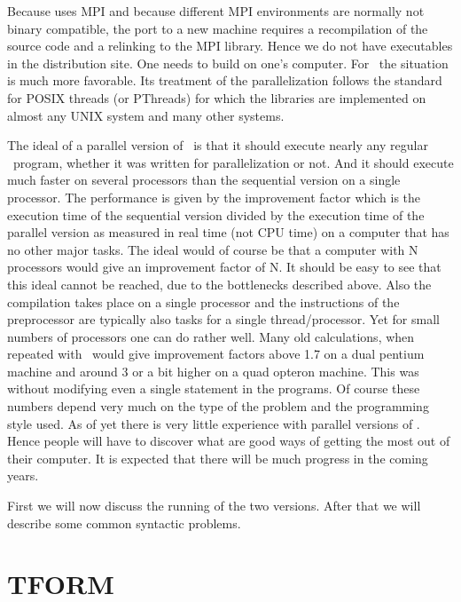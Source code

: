 Because \ParFORM{} uses MPI and because different MPI 
environments are normally not binary compatible, the port to a new machine 
requires a recompilation of the source code and a relinking to the MPI 
library. Hence we do not have executables in the distribution site.
One needs to build \ParFORM{} on one's computer.
For \TFORM\ the situation is much more favorable. Its treatment of the 
parallelization follows the standard for POSIX threads (or 
PThreads) for which the libraries are implemented on almost any 
UNIX system and many other systems.

The ideal of a parallel version of \FORM\ is that it should execute nearly 
any regular \FORM\ program, whether it was written for parallelization or 
not. And it should execute much faster on several processors than the 
sequential version on a single processor. The performance is given by the 
improvement factor which is the execution time of the sequential version 
divided by the execution time of the parallel version as measured in real 
time (not CPU time) on a computer that has no other major tasks. The ideal 
would of course be that a computer with N processors would give an 
improvement factor of N. It should be easy to see that this ideal cannot be 
reached, due to the bottlenecks described above. Also the compilation takes 
place on a single processor and the instructions of the preprocessor are 
typically also tasks for a single thread/processor. Yet for small numbers 
of processors one can do rather well. Many old calculations, when repeated 
with \TFORM\ would give improvement factors above 
1.7 on a dual pentium machine and around 3 or a bit higher 
on a quad opteron machine. This was without modifying even a 
single statement in the programs. Of course these numbers depend very much 
on the type of the problem and the programming style used. As of yet there 
is very little experience with parallel versions of \FORM\@. Hence people will 
have to discover what are good ways of getting the most out of their 
computer. It is expected that there will be much progress in the coming 
years.

First we will now discuss the running of the two versions. After that we 
will describe some common syntactic problems.


\section{TFORM}
\label{tform}

